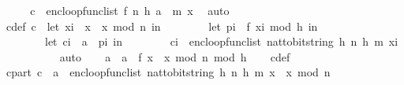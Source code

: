 \begin{isabellebody}
\isanewline
\ \ \isamarkupfalse%
\ \isamarkupfalse%
\ {\isachardoublequoteopen}c\ {\isacharequal}{\kern0pt}\ enc{\isacharunderscore}{\kern0pt}loop{\isacharunderscore}{\kern0pt}func{\isacharunderscore}{\kern0pt}list\ {\isacharparenleft}{\kern0pt}{\isacharquery}{\kern0pt}f{\isacharcomma}{\kern0pt}\ n{\isacharcomma}{\kern0pt}\ h{\isacharcomma}{\kern0pt}\ a\ {\isacharhash}{\kern0pt}\ m{\isacharparenright}{\kern0pt}\ x{\isachardoublequoteclose}\ \isamarkupfalse%
\ auto\isanewline
\ \ \isamarkupfalse%
\ \isamarkupfalse%
\ c{\isacharunderscore}{\kern0pt}def{\isacharcolon}{\kern0pt}\ {\isachardoublequoteopen}c\ {\isacharequal}{\kern0pt}\ {\isacharparenleft}{\kern0pt}let\ x{\isacharunderscore}{\kern0pt}i\ {\isacharequal}{\kern0pt}\ x\ {\isacharasterisk}{\kern0pt}\ x\ mod\ n\ in\isanewline
\ \ \ \ \ \ \ \ let\ p{\isacharunderscore}{\kern0pt}i\ {\isacharequal}{\kern0pt}\ {\isacharquery}{\kern0pt}f\ {\isacharparenleft}{\kern0pt}x{\isacharunderscore}{\kern0pt}i\ mod\ {}{\isacharcircum}{\kern0pt}h{\isacharparenright}{\kern0pt}\ in\isanewline
\ \ \ \ \ \ \ \ let\ c{\isacharunderscore}{\kern0pt}i\ {\isacharequal}{\kern0pt}\ a\ {\isacharbrackleft}{\kern0pt}{\isasymoplus}{\isacharbrackright}{\kern0pt}\ p{\isacharunderscore}{\kern0pt}i\ in\isanewline
\ \ \ \ \ \ \ \ c{\isacharunderscore}{\kern0pt}i\ {\isacharhash}{\kern0pt}\ enc{\isacharunderscore}{\kern0pt}loop{\isacharunderscore}{\kern0pt}func{\isacharunderscore}{\kern0pt}list\ {\isacharparenleft}{\kern0pt}nat{\isacharunderscore}{\kern0pt}to{\isacharunderscore}{\kern0pt}bitstring\ h{\isacharcomma}{\kern0pt}\ n{\isacharcomma}{\kern0pt}\ h{\isacharcomma}{\kern0pt}\ m{\isacharparenright}{\kern0pt}\ x{\isacharunderscore}{\kern0pt}i\isanewline
\ \ \ \ \ \ \ \ {\isacharparenright}{\kern0pt}{\isachardoublequoteclose}\ \isamarkupfalse%
\ auto\isanewline
\ \ \isamarkupfalse%
\ {\isacharquery}{\kern0pt}a{\isacharprime}{\kern0pt}\ {\isacharequal}{\kern0pt}\ {\isachardoublequoteopen}{\isacharparenleft}{\kern0pt}a\ {\isacharbrackleft}{\kern0pt}{\isasymoplus}{\isacharbrackright}{\kern0pt}\ {\isacharquery}{\kern0pt}f\ {\isacharparenleft}{\kern0pt}x\ {\isacharasterisk}{\kern0pt}\ x\ mod\ n\ mod\ {}{\isacharcircum}{\kern0pt}h{\isacharparenright}{\kern0pt}{\isacharparenright}{\kern0pt}{\isachardoublequoteclose}\isanewline
\isanewline
\ \ \isamarkupfalse%
\ c{\isacharunderscore}{\kern0pt}def\ \isamarkupfalse%
\ c{\isacharunderscore}{\kern0pt}part{\isacharcolon}{\kern0pt}\ {\isachardoublequoteopen}c\ {\isacharequal}{\kern0pt}\ {\isacharquery}{\kern0pt}a{\isacharprime}{\kern0pt}\ {\isacharhash}{\kern0pt}\ enc{\isacharunderscore}{\kern0pt}loop{\isacharunderscore}{\kern0pt}func{\isacharunderscore}{\kern0pt}list\ {\isacharparenleft}{\kern0pt}nat{\isacharunderscore}{\kern0pt}to{\isacharunderscore}{\kern0pt}bitstring\ h{\isacharcomma}{\kern0pt}\ n{\isacharcomma}{\kern0pt}\ h{\isacharcomma}{\kern0pt}\ m{\isacharparenright}{\kern0pt}\ {\isacharparenleft}{\kern0pt}x\ {\isacharasterisk}{\kern0pt}\ x\ mod\ n{\isacharparenright}{\kern0pt}{\isachardoublequoteclose}\ \isamarkupfalse%

\end{isabellebody}
